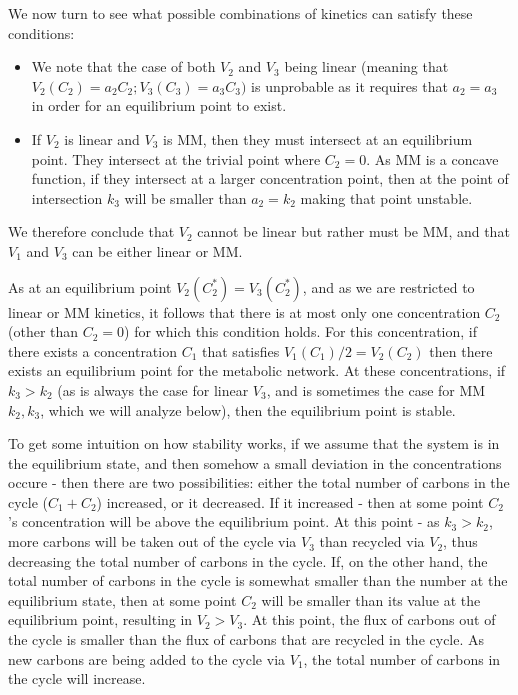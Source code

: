 \documentclass[a4page,notitlepage]{article}
\begin{document}
We now turn to see what possible combinations of kinetics can satisfy these conditions:
\begin{itemize}
\item We note that the case of both $V_2$ and $V_3$ being linear (meaning that $V_2(C_2)=a_2C_2;V_3(C_3)=a_3C_3)$ is unprobable as it requires that $a_2=a_3$ in order for an equilibrium point to exist.
\item If $V_2$ is linear and $V_3$ is MM, then they must intersect at an equilibrium point.
They intersect at the trivial point where $C_2=0$.
As MM is a concave function, if they intersect at a larger concentration point, then at the point of intersection $k_3$ will be smaller than $a_2=k_2$ making that point unstable.
\end{itemize}
We therefore conclude that $V_2$ cannot be linear but rather must be MM, and that $V_1$ and $V_3$ can be either linear or MM.

As at an equilibrium point $V_2(C_2^*)=V_3(C_2^*)$, and as we are restricted to linear or MM kinetics, it follows that there is at most only one concentration $C_2$ (other than $C_2=0$) for which this condition holds.
For this concentration, if there exists a concentration $C_1$ that satisfies $V_1(C_1)/2=V_2(C_2)$ then there exists an equilibrium point for the metabolic network.
At these concentrations, if $k_3>k_2$ (as is always the case for linear $V_3$, and is sometimes the case for MM $k_2,k_3$, which we will analyze below), then the equilibrium point is stable.

To get some intuition on how stability works, if we assume that the system is in the equilibrium state, and then somehow a small deviation in the concentrations occure - then there are two possibilities: either the total number of carbons in the cycle ($C_1+C_2$) increased, or it decreased.
If it increased - then at some point $C_2$'s concentration will be above the equilibrium point.
At this point - as $k_3>k_2$, more carbons will be taken out of the cycle via $V_3$ than recycled via $V_2$, thus decreasing the total number of carbons in the cycle.
If, on the other hand, the total number of carbons in the cycle is somewhat smaller than the number at the equilibrium state, then at some point $C_2$ will be smaller than its value at the equilibrium point, resulting in $V_2>V_3$.
At this point, the flux of carbons out of the cycle is smaller than the flux of carbons that are recycled in the cycle.
As new carbons are being added to the cycle via $V_1$, the total number of carbons in the cycle will increase.
\end{document}
